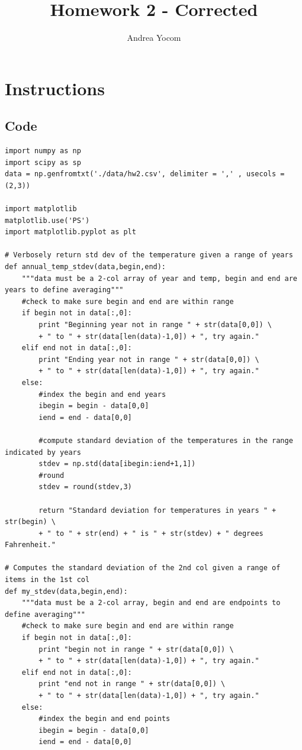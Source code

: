 \documentclass[12pt,a4paper]{article} %
\title{Homework 2 - Corrected}
\author{Andrea Yocom}
\begin{document}
 
\maketitle	
\tableofcontents

\section{Instructions}

%

\begin{landscape}
\section{Code}
\begin{verbatim}
import numpy as np
import scipy as sp
data = np.genfromtxt('./data/hw2.csv', delimiter = ',' , usecols = (2,3))

import matplotlib
matplotlib.use('PS')
import matplotlib.pyplot as plt

# Verbosely return std dev of the temperature given a range of years
def annual_temp_stdev(data,begin,end):
    """data must be a 2-col array of year and temp, begin and end are years to define averaging"""
    #check to make sure begin and end are within range
    if begin not in data[:,0]:
        print "Beginning year not in range " + str(data[0,0]) \
        + " to " + str(data[len(data)-1,0]) + ", try again."
    elif end not in data[:,0]:
        print "Ending year not in range " + str(data[0,0]) \
        + " to " + str(data[len(data)-1,0]) + ", try again."
    else:
        #index the begin and end years
        ibegin = begin - data[0,0]
        iend = end - data[0,0]
        
        #compute standard deviation of the temperatures in the range indicated by years
        stdev = np.std(data[ibegin:iend+1,1])
        #round
        stdev = round(stdev,3)
        
        return "Standard deviation for temperatures in years " + str(begin) \
        + " to " + str(end) + " is " + str(stdev) + " degrees Fahrenheit."

# Computes the standard deviation of the 2nd col given a range of items in the 1st col
def my_stdev(data,begin,end):
    """data must be a 2-col array, begin and end are endpoints to define averaging"""
    #check to make sure begin and end are within range
    if begin not in data[:,0]:
        print "begin not in range " + str(data[0,0]) \
        + " to " + str(data[len(data)-1,0]) + ", try again."
    elif end not in data[:,0]:
        print "end not in range " + str(data[0,0]) \
        + " to " + str(data[len(data)-1,0]) + ", try again."
    else:
        #index the begin and end points
        ibegin = begin - data[0,0]
        iend = end - data[0,0]
        

\end{verbatim}
\end{landscape}
\end{document}
